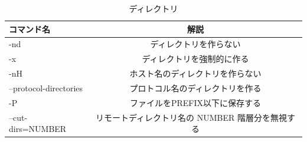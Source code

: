 \begin{table}[H]
  \begin{center}
    \caption{ディレクトリ}
    \begin{tabular}{|l|c|} \hline
      コマンド名 & 解説  \\ \hline
-nd & ディレクトリを作らない \\
-x & ディレクトリを強制的に作る \\
-nH & ホスト名のディレクトリを作らない \\
--protocol-directories & プロトコル名のディレクトリを作る \\
-P & ファイルをPREFIX以下に保存する \\
--cut-dirs=NUMBER & リモートディレクトリ名の NUMBER 階層分を無視する \\ \hline
    \end{tabular}
  \end{center}
\end{table}


